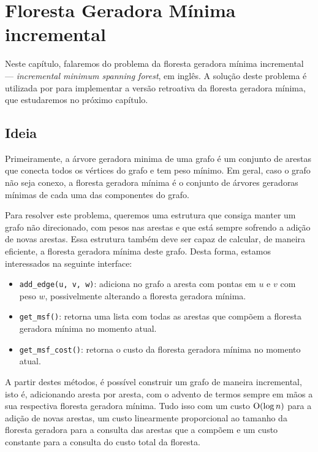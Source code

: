 
\chapter{Floresta Geradora Mínima incremental}
\label{cap:incremental-msf}

Neste capítulo, falaremos do problema da floresta geradora mínima incremental --- \emph{incremental minimum spanning forest}, em inglês. A solução deste problema é utilizada por \citet{10.1093/comjnl/bxaa135} para implementar a versão retroativa da floresta geradora mínima, que estudaremos no próximo capítulo.

\section{Ideia}
\label{sec:imsf-ideia}

Primeiramente, a árvore geradora minima de uma grafo é um conjunto de arestas que conecta todos os vértices do grafo e tem peso mínimo. Em geral, caso o grafo não seja conexo, a floresta geradora mínima é o conjunto de árvores geradoras mínimas de cada uma das componentes do grafo.

Para resolver este problema, queremos uma estrutura que consiga manter um grafo não direcionado, com pesos nas arestas e que está sempre sofrendo a adição de novas arestas. Essa estrutura também deve ser capaz de calcular, de maneira eficiente, a floresta geradora mínima deste grafo. Desta forma, estamos interessados na seguinte interface:

\begin{itemize}
    \item \texttt{add\_edge(u, v, w)}: adiciona no grafo a aresta com pontas em $u$ e $v$ com peso $w$, possivelmente alterando a floresta geradora mínima.
    \item \texttt{get\_msf()}: retorna uma lista com todas as arestas que compõem a floresta geradora mínima no momento atual.
    \item \texttt{get\_msf\_cost()}: retorna o custo da floresta geradora mínima no momento atual.
\end{itemize}

A partir destes métodos, é possível construir um grafo de maneira incremental, isto é, adicionando aresta por aresta, com o advento de termos sempre em mãos a sua respectiva floresta geradora mínima. Tudo isso com um custo $\mathrm{O} (\log n)$ para a adição de novas arestas, um custo linearmente proporcional ao tamanho da floresta geradora para a consulta das arestas que a compõem e um custo constante para a consulta do custo total da floresta.

